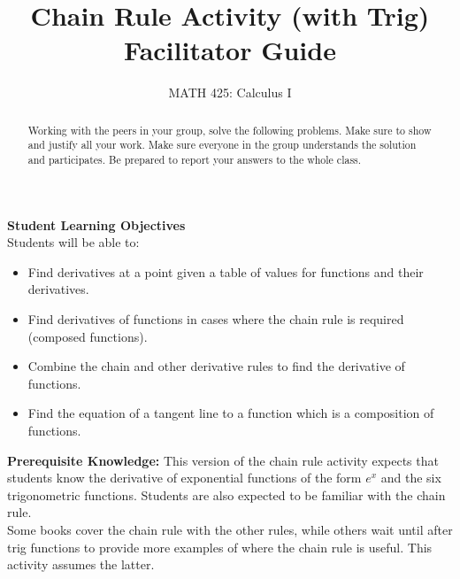 \documentclass{ximera}
\title{Chain Rule Activity (with Trig) Facilitator Guide}  %
\author{MATH 425: Calculus I}
\begin{document}
\begin{abstract}
    Working with the peers in your group, solve the following problems. Make sure to show and justify all your work. Make sure everyone in the group understands the solution and participates. Be prepared to report your answers to the whole class. 
\end{abstract}
\maketitle

\textbf{Student Learning Objectives}\\
Students will be able to:
    \begin{itemize}
        \item Find derivatives at a point given a table of values for functions and their derivatives.
        \item Find derivatives of functions in cases where the chain rule is required (composed functions).
        \item Combine the chain and other derivative rules to find the derivative of functions.
        \item Find the equation of a tangent line to a function which is a composition of functions.
    \end{itemize}

\textbf{Prerequisite Knowledge:} This version of the chain rule activity expects that students know the derivative of exponential functions of the form $e^x$ and the six trigonometric functions.  Students are also expected to be familiar with the chain rule.  \\

Some books cover the chain rule with the other rules, while others wait until after trig functions to provide more examples of where the chain rule is useful.  This activity assumes the latter.  
\end{document}
